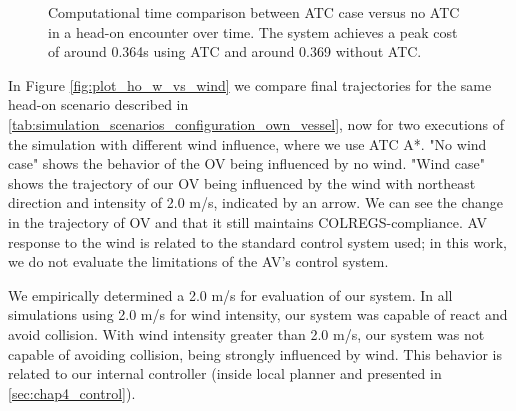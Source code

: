         
        \begin{figure}[H]
            \centering
            
            \caption{Computational time comparison between \ac{ATC} case versus no \ac{ATC} in a head-on encounter over time. The system achieves a peak cost of around 0.364s using \ac{ATC} and around 0.369 without \ac{ATC}.}
            \label{fig:plot_ho_w_vs_wo_CT}
        \end{figure}
        
        In Figure \ref{fig:plot_ho_w_vs_wind} we compare final trajectories for the same head-on scenario described in \ref{tab:simulation_scenarios_configuration_own_vessel}, now for two executions of the simulation with different wind influence, where we use \ac{ATC} A*. "No wind case" shows the behavior of the \ac{OV} being influenced by no wind. "Wind case" shows the trajectory of our \ac{OV} being influenced by the wind with northeast direction and intensity of 2.0 m/s, indicated by an arrow. We can see the change in the trajectory of \ac{OV} and that it still maintains \ac{COLREGS}-compliance. \ac{AV} response to the wind is related to the standard control system used; in this work, we do not evaluate the limitations of the \ac{AV}'s control system.
        
        We empirically determined a 2.0 m/s for evaluation of our system. In all simulations using 2.0 m/s for wind intensity, our system was capable of react and avoid collision. With wind intensity greater than 2.0 m/s, our system was not capable of avoiding collision, being strongly influenced by wind. This behavior is related to our internal controller (inside local planner and presented in \ref{sec:chap4_control}). 
        

